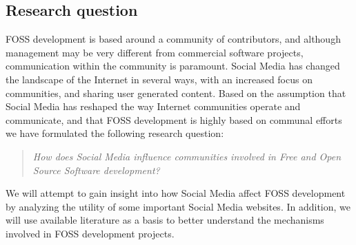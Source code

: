 \documentclass[a4paper,11pt]{article} %
\begin{document}

\subsection{Research question}

FOSS development is based around a community of contributors, and
although management may be very different from commercial software
projects, communication within the community is paramount. Social
Media has changed the landscape of the Internet in several ways, with
an increased focus on communities, and sharing user generated
content\cite{Kaplan201059}.  Based on the assumption that Social Media
has reshaped the way Internet communities operate and communicate, and
that FOSS development is highly based on communal efforts we have
formulated the following research question:
\begin{quote}
  \textit{How does Social Media influence communities involved in Free
    and Open Source Software development?}
\end{quote}

We will attempt to gain insight into how Social Media affect FOSS development
by analyzing the utility of some important Social Media websites. In addition,
we will use available literature as a basis to better understand the mechanisms
involved in FOSS development projects. 
\end{document}

